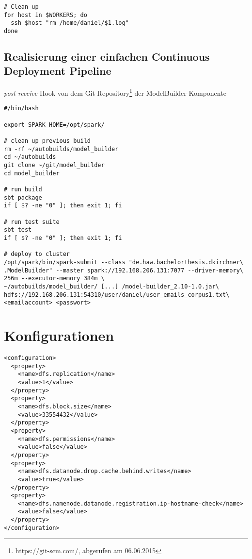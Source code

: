 \begin{appendices}
\begin{lstlisting}[caption={Monitoring des Clusters (Betriebssystem), Beispiel ModelBuilder},label={lst:monitor_cluster}]
# Clean up
for host in $WORKERS; do
  ssh $host "rm /home/daniel/$1.log"
done
\end{lstlisting}

\subsection{Realisierung einer einfachen Continuous Deployment Pipeline}\label{subsec:pipeline}
\textit{post-receive}-Hook von dem Git-Repository\footnote{https://git-scm.com/, abgerufen am 06.06.2015} der ModelBuilder-Komponente
\begin{lstlisting}[caption={Einfache Continuous Deployment Pipeline. Beispiel: ModelBuilder},label={lst:cdp_modelbuilder}]
#/bin/bash

export SPARK_HOME=/opt/spark/

# clean up previous build
rm -rf ~/autobuilds/model_builder
cd ~/autobuilds
git clone ~/git/model_builder
cd model_builder

# run build
sbt package
if [ $? -ne "0" ]; then exit 1; fi

# run test suite
sbt test
if [ $? -ne "0" ]; then exit 1; fi

# deploy to cluster
/opt/spark/bin/spark-submit --class "de.haw.bachelorthesis.dkirchner\
.ModelBuilder" --master spark://192.168.206.131:7077 --driver-memory\
256m --executor-memory 384m \
~/autobuilds/model_builder/ [...] /model-builder_2.10-1.0.jar\
hdfs://192.168.206.131:54310/user/daniel/user_emails_corpus1.txt\
<emailaccount> <passwort>
\end{lstlisting}

\section{Konfigurationen}

\begin{lstlisting}[caption={hdfs-site.xml (Auszug): Beispiel mit Replikationsfaktor 1 und Blockgröße 32MB},label={lst:hdfs_config}]
<configuration>
  <property>
    <name>dfs.replication</name>
    <value>1</value>
  </property>
  <property>
    <name>dfs.block.size</name>
    <value>33554432</value>
  </property>
  <property>
    <name>dfs.permissions</name>
    <value>false</value>
  </property>
  <property>
    <name>dfs.datanode.drop.cache.behind.writes</name>
    <value>true</value>
  </property>
  <property>
    <name>dfs.namenode.datanode.registration.ip-hostname-check</name>
    <value>false</value>
  </property>
</configuration>
\end{lstlisting}


\end{appendices}
